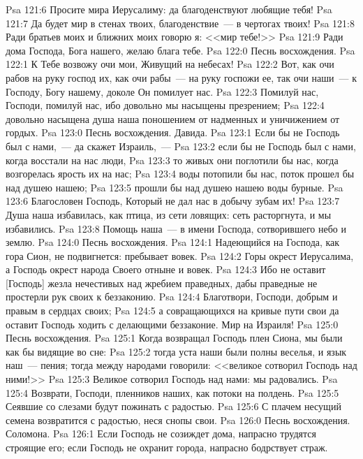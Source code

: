 \vs Psa 121:6 Просите мира Иерусалиму: да благоденствуют любящие тебя!
\vs Psa 121:7 Да будет мир в стенах твоих, благоденствие~--- в чертогах твоих!
\vs Psa 121:8 Ради братьев моих и ближних моих говорю я: <<мир тебе!>>
\vs Psa 121:9 Ради дома Господа, Бога нашего, желаю блага тебе.
\vs Psa 122:0 Песнь восхождения.
\rsbpar\vs Psa 122:1 К Тебе возвожу очи мои, Живущий на небесах!
\vs Psa 122:2 Вот, как очи рабов  на руку господ их, как очи рабы~--- на руку госпожи ее, так очи наши~--- к Господу, Богу нашему, доколе Он помилует нас.
\vs Psa 122:3 Помилуй нас, Господи, помилуй нас, ибо довольно мы насыщены презрением;
\vs Psa 122:4 довольно насыщена душа наша поношением от надменных и уничижением от гордых.
\vs Psa 123:0 Песнь восхождения. Давида.
\rsbpar\vs Psa 123:1 Если бы не Господь был с нами,~--- да скажет Израиль,~---
\vs Psa 123:2 если бы не Господь был с нами, когда восстали на нас люди,
\vs Psa 123:3 то живых они поглотили бы нас, когда возгорелась ярость их на нас;
\vs Psa 123:4 воды потопили бы нас, поток прошел бы над душею нашею;
\vs Psa 123:5 прошли бы над душею нашею воды бурные.
\vs Psa 123:6 Благословен Господь, Который не дал нас в добычу зубам их!
\vs Psa 123:7 Душа наша избавилась, как птица, из сети ловящих: сеть расторгнута, и мы избавились.
\vs Psa 123:8 Помощь наша~--- в имени Господа, сотворившего небо и землю.
\vs Psa 124:0 Песнь восхождения.
\rsbpar\vs Psa 124:1 Надеющийся на Господа, как гора Сион, не подвигнется: пребывает вовек.
\vs Psa 124:2 Горы окрест Иерусалима, а Господь окрест народа Своего отныне и вовек.
\vs Psa 124:3 Ибо не оставит [Господь] жезла нечестивых над жребием праведных, дабы праведные не простерли рук своих к беззаконию.
\vs Psa 124:4 Благотвори, Господи, добрым и правым в сердцах своих;
\vs Psa 124:5 а совращающихся на кривые пути свои да оставит Господь ходить с делающими беззаконие. Мир на Израиля!
\vs Psa 125:0 Песнь восхождения.
\rsbpar\vs Psa 125:1 Когда возвращал Господь плен Сиона, мы были как бы видящие во сне:
\vs Psa 125:2 тогда уста наши были полны веселья, и язык наш~--- пения; тогда между народами говорили: <<великое сотворил Господь над ними!>>
\vs Psa 125:3 Великое сотворил Господь над нами: мы радовались.
\vs Psa 125:4 Возврати, Господи, пленников наших, как потоки на полдень.
\vs Psa 125:5 Сеявшие со слезами будут пожинать с радостью.
\vs Psa 125:6 С плачем несущий семена возвратится с радостью, неся снопы свои.
\vs Psa 126:0 Песнь восхождения. Соломона.
\rsbpar\vs Psa 126:1 Если Господь не созиждет дома, напрасно трудятся строящие его; если Господь не охранит города, напрасно бодрствует страж.
